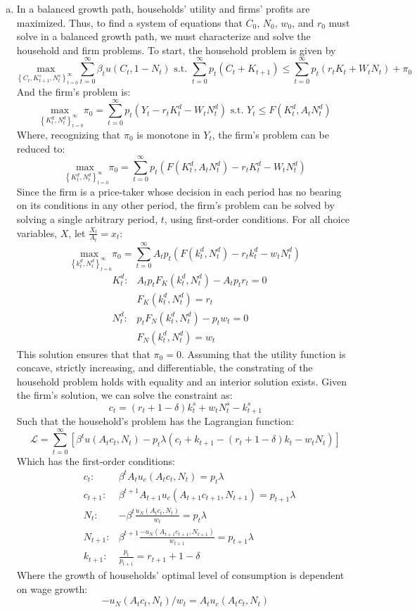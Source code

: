 \documentclass{article}
\newcommand{\usmax}[1]{\underset{#1}{\text{max }}}
\renewcommand{\L}{\mathcal{L}}
\newcommand{\zinf}{_{t=0}^\infty}
\begin{document}
\begin{enumerate}[(a)]
	\item In a balanced growth path, households' utility and firms' profits are maximized. Thus, to find a system of equations that $C_0$, $N_0$, $w_0$, and $r_0$ must solve in a balanced growth path, we must characterize and solve the household and firm problems. To start, the household problem is given by 
		\[
			\usmax{\left\{C_t,K^s_{t+1},N^s_t\right\}_{t=0}^\infty}\sum_{t=0}^\infty \beta_t u(C_t,1-N_t)\text{ s.t. }
				\sum_{t=0}^\infty p_t\left(C_t + K_{t+1}\right) \leq \sum_{t=0}^\infty p_t\left(r_tK_t + W_tN_t\right) + \pi_0
		\]
		And the firm's problem is:
		\[
			\usmax{\left\{K_t^d,N_t^d\right\}_{t=0}^\infty}\pi_0 = \sum\zinf p_t\left(Y_t-r_tK_t^d - W_tN_t^d\right)\text{ s.t. } Y_t\leq F(K_t^d,A_tN_t^d)
		\]
		Where, recognizing that $\pi_0$ is monotone in $Y_t$, the firm's problem can be reduced to:
		\[
			\usmax{\left\{K_t^d,N_t^d\right\}_{t=0}^\infty}\pi_0 = \sum\zinf p_t\left(F(K_t^d,A_tN_t^d)-r_tK_t^d - W_tN_t^d\right)
		\]
		Since the firm is a price-taker whose decision in each period has no bearing on its conditions in any other period, the firm's problem can be solved by solving a single arbitrary period, $t$, using first-order conditions. For all choice variables, $X$, let ${\frac{X_t}{A_t} = x_t}$:
		\[
			\usmax{\left\{k_t^d,N_t^d\right\}_{t=0}^\infty}\pi_0 = \sum\zinf A_tp_t\left(F(k_t^d,N_t^d)-r_tk_t^d - w_tN_t^d\right)
		\]
		\begin{align*}
			&K_t^d: & A_tp_tF_K(k_t^d,N_t^d) -A_tp_tr_t = 0	\\
			&		& F_K(k_t^d,N_t^d) = r_t				\\
			&N_t^d:	& p_tF_N(k_t^d,N_t^d) -p_tw_t = 0	\\
			&		& F_N(k_t^d,N_t^d) = w_t
		\end{align*}
		This solution ensures that that $\pi_0=0$. Assuming that the utility function is concave, strictly increasing, and differentiable, the constrating of the household problem holds with equality and an interior solution exists. Given the firm's solution, we can solve the constraint as:
		\[
				c_t = (r_t+1-\delta)k^s_t + w_tN^s_t - k^s_{t+1}
		\]
		Such that the household's problem has the Lagrangian function:
		\[
			\L = \sum\zinf\left[\beta^tu(A_tc_t,N_t) - p_t\lambda\left(c_t + k_{t+1} - (r_t+1-\delta)k_t - w_tN_t\right)\right]
		\]
		Which has the first-order conditions:
		\begin{align*}
			&c_t: 			& \beta^tA_tu_c(A_tc_t,N_t) = 	p_t\lambda 									\\
			&c_{t+1}:		& \beta^{t+1}A_{t+1}u_c(A_{t+1}c_{t+1},N_{t+1}) = 	p_{t+1}\lambda 			\\
			&N_t:			& -\beta^t\frac{u_N(A_tc_t,N_t)}{w_t} = p_t\lambda							\\
			&N_{t+1}:		& \beta^{t+1}\frac{-u_N(A_{t+1}c_{t+1},N_{t+1})}{w_{t+1}} = p_{t+1}\lambda	\\
			&k_{t+1}:		& \frac{p_t}{p_{t+1}} = r_{t+1} + 1 - \delta
		\end{align*}
		Where the growth of households' optimal level of consumption is dependent on wage growth:
		\[
			-u_N(A_tc_t,N_t)/w_t = A_tu_c(A_tc_t,N_t) 
		\]
		

\end{enumerate}
\end{document}
